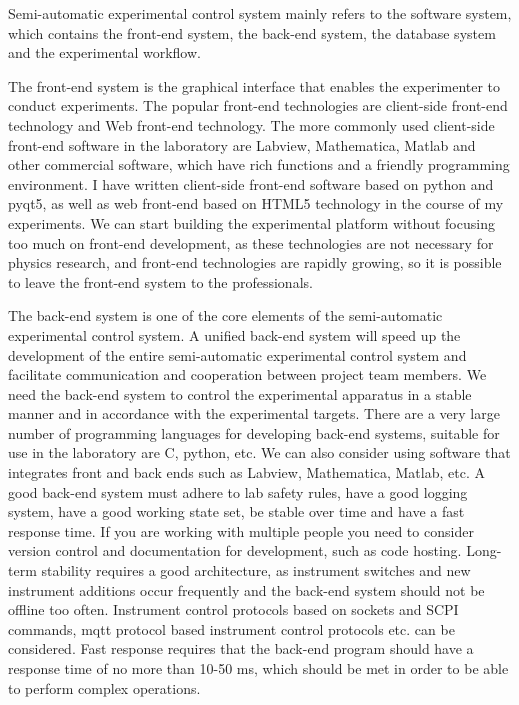 Semi-automatic experimental control system mainly refers to the software system, which contains the front-end system, the back-end system, the database system and the experimental workflow.

The front-end system is the graphical interface that enables the experimenter to conduct experiments. The popular front-end technologies are client-side front-end technology and Web front-end technology. The more commonly used client-side front-end software in the laboratory are Labview, Mathematica, Matlab and other commercial software, which have rich functions and a friendly programming environment. I have written client-side front-end software based on python and pyqt5, as well as web front-end based on HTML5 technology in the course of my experiments. We can start building the experimental platform without focusing too much on front-end development, as these technologies are not necessary for physics research, and front-end technologies are rapidly growing, so it is possible to leave the front-end system to the professionals.

The back-end system is one of the core elements of the semi-automatic experimental control system. A unified back-end system will speed up the development of the entire semi-automatic experimental control system and facilitate communication and cooperation between project team members. We need the back-end system to control the experimental apparatus in a stable manner and in accordance with the experimental targets. There are a very large number of programming languages for developing back-end systems, suitable for use in the laboratory are C, python, etc. We can also consider using software that integrates front and back ends such as Labview, Mathematica, Matlab, etc. A good back-end system must adhere to lab safety rules, have a good logging system, have a good working state set, be stable over time and have a fast response time. If you are working with multiple people you need to consider version control and documentation for development, such as code hosting. Long-term stability requires a good architecture, as instrument switches and new instrument additions occur frequently and the back-end system should not be offline too often. Instrument control protocols based on sockets and SCPI commands, mqtt protocol based instrument control protocols etc. can be considered. Fast response requires that the back-end program should have a response time of no more than 10-50 ms, which should be met in order to be able to perform complex operations.

